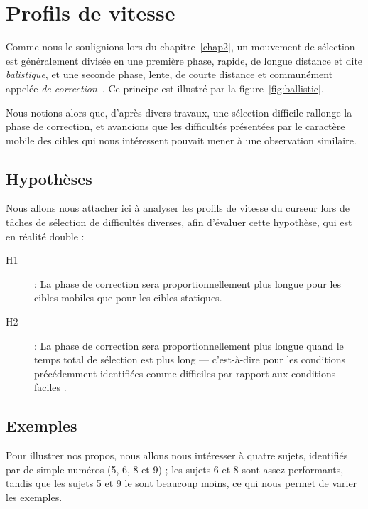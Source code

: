 \section{Profils de vitesse}
	Comme nous le soulignions lors du chapitre~\ref{chap2}, un mouvement de sélection est généralement divisée en une première phase, rapide, de longue distance et dite \emph{balistique}, et une seconde phase, lente, de courte distance et communément appelée \emph{de correction}~\cite{mackenzie1987three, crossman1983feedback}. Ce principe est illustré par la figure~\ref{fig:ballistic}.
	
	Nous notions alors que, d'après divers travaux, une sélection difficile rallonge la phase de correction, et avancions que les difficultés présentées par le caractère mobile des cibles qui nous intéressent pouvait mener à une observation similaire.
	
	\subsection{Hypothèses}
	Nous allons nous attacher ici à analyser les profils de vitesse du curseur lors de tâches de sélection de difficultés diverses, afin d'évaluer cette hypothèse, qui est en réalité double :
	
	\begin{description}
		\item[H1] : La phase de correction sera proportionnellement plus longue pour les cibles mobiles que pour les cibles statiques.
		\item[H2] : La phase de correction sera proportionnellement plus longue quand le temps total de sélection est plus long --- c'est-à-dire pour les conditions précédemment identifiées comme \og difficiles \fg{} par rapport aux conditions \og faciles \fg{}.
	\end{description}
	
	\subsection{Exemples}
	Pour illustrer nos propos, nous allons nous intéresser à quatre sujets, identifiés par de simple numéros (5, 6, 8 et 9) ; les sujets 6 et 8 sont assez performants, tandis que les sujets 5 et 9 le sont beaucoup moins, ce qui nous permet de varier les exemples.
	
